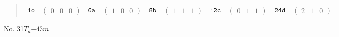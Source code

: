 \documentclass[fleqn,9pt,landscape]{jsarticle}
\begin{document}
\begin{quote}
\begin{tabular}{cccccccccc}
$ {\tt 1o} $ & $ \begin{pmatrix} 0 & 0 & 0 \end{pmatrix} $ & $ {\tt 6a} $ & $ \begin{pmatrix} 1 & 0 & 0 \end{pmatrix} $ & $ {\tt 8b} $ & $ \begin{pmatrix} 1 & 1 & 1 \end{pmatrix} $ & $ {\tt 12c} $ & $ \begin{pmatrix} 0 & 1 & 1 \end{pmatrix} $ & $ {\tt 24d} $ & $ \begin{pmatrix} 2 & 1 & 0 \end{pmatrix} $
\end{tabular}
\end{quote}
\newpage
No. 31\quad$T_{d}$\quad$-43m$\quad[ cubic ]
\end{document}
